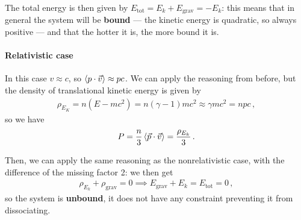 \documentclass[main.tex]{subfiles}
\begin{document}
The total energy is then given by \(E _{\text{tot}} = E_k + E _{\text{grav}} = - E_k\): this means that in general the system will be \textbf{bound} --- the kinetic energy is quadratic, so always positive --- and that the hotter it is, the more bound it is.



\paragraph{Relativistic case}

In this case \(v \approx c\), so \(\expval{p \cdot \vec{v}} \approx pc\). We can apply the reasoning from before, but the density of translational kinetic energy is given by 
%
\begin{align}
\rho_{E_K} = n (E - mc^2) = n (\gamma -1) mc^2 \approx \gamma mc^2 = npc 
\,,
\end{align}
%
so we have 
%
\begin{align}
P = \frac{n}{3} \expval{\vec{p} \cdot \vec{v}} = \frac{\rho _{E_k}}{3}
\,.
\end{align}

Then, we can apply the same reasoning as the nonrelativistic case, with the difference of the missing factor 2: we then get 
%
\begin{align}
\rho_{E_k} + \rho_{\text{grav}} = 0 \implies
E _{\text{grav}} + E_k = E _{\text{tot}} = 0
\,,
\end{align}
%
so the system is \textbf{unbound}, it does not have any constraint preventing it from dissociating. 


\end{document}
